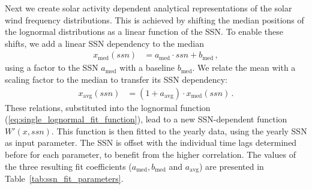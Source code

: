 Next we create solar activity dependent analytical representations of the solar wind frequency distributions. This is achieved by shifting the median positions of the lognormal distributions as a linear function of the SSN. To enable these shifts, we add a linear SSN dependency to the median
\begin{align}
	x_\text{med}(ssn) &= a_\text{med} \cdot ssn + b_\text{med}\,,	\label{eq:median_with_ssn}
\end{align}
using a factor to the SSN $a_\text{med}$ with a baseline $b_\text{med}$. We relate the mean with a scaling factor to the median to transfer its SSN dependency:
\begin{align}
	x_\text{avg}(ssn) &= \left(1 + a_\text{avg}\right) \cdot x_\text{med}(ssn)\,.	\label{eq:mean_with_ssn}
\end{align}
These relations, substituted into the lognormal function (\ref{eq:single_lognormal_fit_function}), lead to a new SSN-dependent function $W'(x,ssn)$. This function is then fitted to the yearly data, using the yearly SSN as input parameter. The SSN is offset with the individual time lags determined before for each parameter, to benefit from the higher correlation. The values of the three resulting fit coefficients ($a_\text{med}, b_\text{med}$ and $a_\text{avg}$) are presented in Table~\ref{tab:ssn_fit_parameters}.
